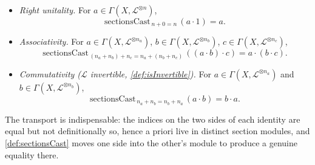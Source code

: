 \begin{lemma}
\begin{itemize}
      \[
        \mathrm{sectionsCast}_{\,0+n=n}\,(1 \cdot a) = a .
      \]
    \item \emph{Right unitality.} For \(a \in \Gamma(X, \mathcal{L}^{\otimes n})\),
      \[
        \mathrm{sectionsCast}_{\,n+0=n}\,(a \cdot 1) = a .
      \]
    \item \emph{Associativity.} For
      \(a \in \Gamma(X, \mathcal{L}^{\otimes n_a})\),
      \(b \in \Gamma(X, \mathcal{L}^{\otimes n_b})\),
      \(c \in \Gamma(X, \mathcal{L}^{\otimes n_c})\),
      \[
        \mathrm{sectionsCast}_{\,(n_a+n_b)+n_c = n_a+(n_b+n_c)}\,
          ((a \cdot b) \cdot c) = a \cdot (b \cdot c) .
      \]
    \item \emph{Commutativity (\(\mathcal{L}\) invertible,
      \cref{def:isInvertible}).} For
      \(a \in \Gamma(X, \mathcal{L}^{\otimes n_a})\) and
      \(b \in \Gamma(X, \mathcal{L}^{\otimes n_b})\),
      \[
        \mathrm{sectionsCast}_{\,n_a+n_b = n_b+n_a}\,(a \cdot b) = b \cdot a .
      \]
  \end{itemize}
  The transport is indispensable: the indices on the two sides of each identity
  are equal but not definitionally so, hence a priori live in distinct section
  modules, and \cref{def:sectionsCast} moves one side into the other's module to
  produce a genuine equality there.
\end{lemma}

